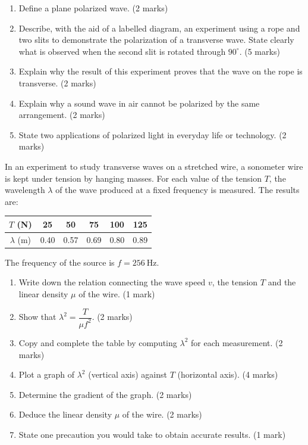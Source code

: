 \documentclass[11pt]{article}
\newcounter{popsec}
\newcounter{popsub}
\newcommand{\courssub}[1]{%
  \stepcounter{popsub}%
  \par\vspace{9pt}\noindent{\popxbold\fontsize{11.5}{13}\selectfont\color{popink}{\color{poporange}\thepopsec.\thepopsub}\hspace{6pt}#1}\par\nopagebreak\vspace{4pt}
}
\begin{document}
\courssub{I prepare for the GCE}

\begin{exercice}
\begin{enumerate}
\item Define a plane polarized wave. \hfill (2 marks)
\item Describe, with the aid of a labelled diagram, an experiment using a rope and two slits to demonstrate the polarization of a transverse wave. State clearly what is observed when the second slit is rotated through $90^{\circ}$. \hfill (5 marks)
\item Explain why the result of this experiment proves that the wave on the rope is transverse. \hfill (2 marks)
\item Explain why a sound wave in air cannot be polarized by the same arrangement. \hfill (2 marks)
\item State two applications of polarized light in everyday life or technology. \hfill (2 marks)
\end{enumerate}
\end{exercice}

\begin{exercice}
In an experiment to study transverse waves on a stretched wire, a sonometer wire is kept under tension by hanging masses. For each value of the tension $T$, the wavelength $\lambda$ of the wave produced at a fixed frequency is measured. The results are:

\begin{center}
\begin{tabular}{|c|c|c|c|c|c|}
\hline
\rowcolor{popblueL} $T$ (N) & 25 & 50 & 75 & 100 & 125 \\
\hline
$\lambda$ (m) & 0.40 & 0.57 & 0.69 & 0.80 & 0.89 \\
\hline
\end{tabular}
\end{center}

The frequency of the source is $f = 256\ \mathrm{Hz}$.
\begin{enumerate}
\item Write down the relation connecting the wave speed $v$, the tension $T$ and the linear density $\mu$ of the wire. \hfill (1 mark)
\item Show that $\lambda^2 = \dfrac{T}{\mu f^2}$. \hfill (2 marks)
\item Copy and complete the table by computing $\lambda^2$ for each measurement. \hfill (2 marks)
\item Plot a graph of $\lambda^2$ (vertical axis) against $T$ (horizontal axis). \hfill (4 marks)
\item Determine the gradient of the graph. \hfill (2 marks)
\item Deduce the linear density $\mu$ of the wire. \hfill (2 marks)
\item State one precaution you would take to obtain accurate results. \hfill (1 mark)
\end{enumerate}
\end{exercice}
\end{document}
